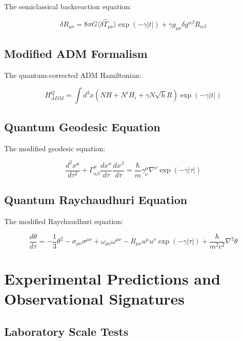 \documentclass[12pt]{article}
\theoremstyle{plain}
\theoremstyle{definition}
\theoremstyle{remark}
\begin{document}
The semiclassical backreaction equation:

\begin{equation}
\delta R_{\mu\nu} = 8\pi G\langle\delta\hat{T}_{\mu\nu}\rangle\exp(-\gamma|t|) + \gamma g_{\mu\nu}\delta g^{\alpha\beta}R_{\alpha\beta}
\end{equation}

\subsection{Modified ADM Formalism}

The quantum-corrected ADM Hamiltonian:

\begin{equation}
H_{ADM}^Q = \int d^3x \left(NH + N^iH_i + \gamma N\sqrt{h}R\right)\exp(-\gamma|t|)
\end{equation}

\subsection{Quantum Geodesic Equation}

The modified geodesic equation:

\begin{equation}
\frac{d^2x^\mu}{d\tau^2} + \Gamma^\mu_{\alpha\beta}\frac{dx^\alpha}{d\tau}\frac{dx^\beta}{d\tau} = 
\frac{\hbar}{m}\gamma^\mu_{\nu}\nabla^\nu\exp(-\gamma|\tau|)
\end{equation}

\subsection{Quantum Raychaudhuri Equation}

The modified Raychaudhuri equation:

\begin{equation}
\frac{d\theta}{d\tau} = -\frac{1}{3}\theta^2 - \sigma_{\mu\nu}\sigma^{\mu\nu} + \omega_{\mu\nu}\omega^{\mu\nu} 
- R_{\mu\nu}u^\mu u^\nu\exp(-\gamma|\tau|) + \frac{\hbar}{m^2c^2}\nabla^2\theta
\end{equation}
\section{Experimental Predictions and Observational Signatures}

\subsection{Laboratory Scale Tests}
\end{document}
